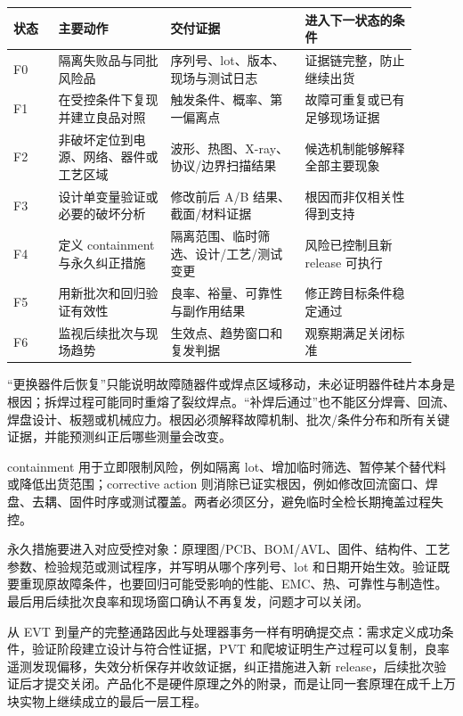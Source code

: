 \begin{longtable}{L{0.10\linewidth}L{0.25\linewidth}L{0.30\linewidth}L{0.25\linewidth}}
\toprule
状态 & 主要动作 & 交付证据 & 进入下一状态的条件 \\
\midrule
F0 & 隔离失败品与同批风险品 & 序列号、lot、版本、现场与测试日志 & 证据链完整，防止继续出货 \\\tablerowrule
F1 & 在受控条件下复现并建立良品对照 & 触发条件、概率、第一偏离点 & 故障可重复或已有足够现场证据 \\\tablerowrule
F2 & 非破坏定位到电源、网络、器件或工艺区域 & 波形、热图、X-ray、协议/边界扫描结果 & 候选机制能够解释全部主要现象 \\\tablerowrule
F3 & 设计单变量验证或必要的破坏分析 & 修改前后 A/B 结果、截面/材料证据 & 根因而非仅相关性得到支持 \\\tablerowrule
F4 & 定义 containment 与永久纠正措施 & 隔离范围、临时筛选、设计/工艺/测试变更 & 风险已控制且新 release 可执行 \\\tablerowrule
F5 & 用新批次和回归验证有效性 & 良率、裕量、可靠性与副作用结果 & 修正跨目标条件稳定通过 \\\tablerowrule
F6 & 监视后续批次与现场趋势 & 生效点、趋势窗口和复发判据 & 观察期满足关闭标准 \\
\bottomrule
\end{longtable}

“更换器件后恢复”只能说明故障随器件或焊点区域移动，未必证明器件硅片本身是根因；拆焊过程可能同时重熔了裂纹焊点。“补焊后通过”也不能区分焊膏、回流、焊盘设计、板翘或机械应力。根因必须解释故障机制、批次/条件分布和所有关键证据，并能预测纠正后哪些测量会改变。


containment 用于立即限制风险，例如隔离 lot、增加临时筛选、暂停某个替代料或降低出货范围；corrective action 则消除已证实根因，例如修改回流窗口、焊盘、去耦、固件时序或测试覆盖。两者必须区分，避免临时全检长期掩盖过程失控。

永久措施要进入对应受控对象：原理图/PCB、BOM/AVL、固件、结构件、工艺参数、检验规范或测试程序，并写明从哪个序列号、lot 和日期开始生效。验证既要重现原故障条件，也要回归可能受影响的性能、EMC、热、可靠性与制造性。最后用后续批次良率和现场窗口确认不再复发，问题才可以关闭。

从 EVT 到量产的完整通路因此与处理器事务一样有明确提交点：需求定义成功条件，验证阶段建立设计与符合性证据，PVT 和爬坡证明生产过程可以复制，良率遥测发现偏移，失效分析保存并收敛证据，纠正措施进入新 release，后续批次验证后才提交关闭。产品化不是硬件原理之外的附录，而是让同一套原理在成千上万块实物上继续成立的最后一层工程。
